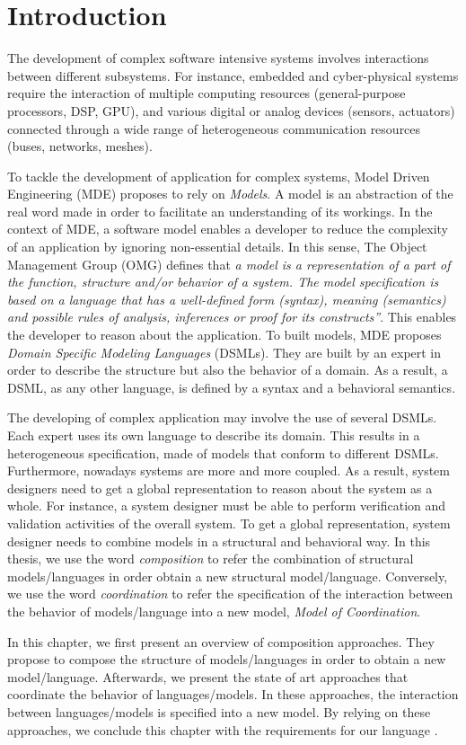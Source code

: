 \section{Introduction}
The development of complex software intensive systems involves interactions between different subsystems. For instance, embedded and cyber-physical systems require the interaction of multiple computing resources (general-purpose processors, DSP, GPU), and various digital or analog devices (sensors, actuators) connected through a wide range of heterogeneous communication resources (buses, networks, meshes).

To tackle the development of application for complex systems, Model Driven Engineering (MDE) proposes to rely on \emph{Models}. A model is an abstraction of the real word made in order to facilitate an understanding of its workings. In the context of MDE, a software model enables a developer to reduce the complexity of an application by ignoring non-essential details. In this sense, The Object Management Group (OMG) defines that \emph{a model is a representation of a part of the function, structure and/or behavior of a system. The model specification is based on a language that has a well-defined form (syntax), meaning (semantics) and possible rules of analysis, inferences or proof for its constructs”}. This enables the developer to reason about the application. To built models, MDE proposes \emph{Domain Specific Modeling Languages} (DSMLs). They are built by an expert in order to describe the structure but also the behavior of a domain. As a result, a DSML, as any other language, is defined by a syntax and a behavioral semantics. 

The developing of complex application may involve the use of several DSMLs. Each expert uses its own language to describe its domain. This results in a heterogeneous specification, \ie made of models that conform to different DSMLs. Furthermore, nowadays systems are more and more coupled. As a result, system designers need to get a global representation to reason about the system as a whole. For instance, a system designer must be able to perform verification and validation activities of the overall system. To get a global representation, system designer needs to combine models in a structural and behavioral way. In this thesis, we use the word \emph{composition} to refer the combination of structural models/languages in order obtain a new structural model/language. Conversely, we use the word \emph{coordination} to refer the specification of the interaction between the behavior of models/language into a new model, \eg \emph{Model of Coordination}.   
 
In this chapter, we first present an overview of composition approaches. They propose to compose the structure of models/languages in order to obtain a new model/language. Afterwards, we present the state of art approaches that coordinate the behavior of languages/models. In these approaches, the interaction between languages/models is specified into a new model. By relying on these approaches, we conclude this chapter with the requirements for our language \bcool.        
